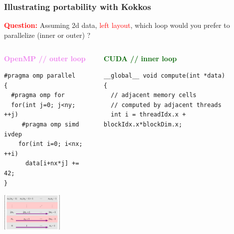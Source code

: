 \begin{frame}[fragile=singleslide]
  \frametitle{Illustrating portability with Kokkos}

  \begin{block}{}
    {\textcolor{Red}{\bf Question:}
    Assuming 2d data, \textcolor{red}{left layout}, which loop would you prefer to parallelize (inner or outer) ?}
  \end{block}

  \begin{columns}
    \begin{column}{0.48\textwidth}
      \begin{center}
        \textcolor{violet}{\bf OpenMP // outer loop}

        \begin{minipage}{1.0\textwidth}
      {
        \scriptsize
        \begin{verbatim}
#pragma omp parallel
{
  #pragma omp for
  for(int j=0; j<ny; ++j)
     #pragma omp simd ivdep
    for(int i=0; i<nx; ++i)
      data[i+nx*j] += 42;
}
        \end{verbatim}
      }
      \end{minipage}
      \end{center}

      \begin{center}

        \includegraphics[width=3.0cm]{tikz/row-major-openmp}

      \end{center}
    \end{column}
    \begin{column}{0.48\textwidth}
      \begin{center}
        \textcolor{darkgreen}{\bf CUDA // inner loop}
      \end{center}
      {\tiny
        \begin{verbatim}
__global__ void compute(int *data)
{
  // adjacent memory cells
  // computed by adjacent threads
  int i = threadIdx.x + blockIdx.x*blockDim.x;


\end{verbatim}}
\end{column}
\end{columns}
\end{frame}
